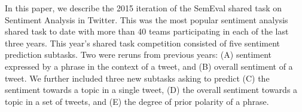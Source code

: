 In this paper, we describe the 2015 iteration of the SemEval shared task on Sentiment Analysis in Twitter.                                      This was the most popular sentiment analysis shared task to date with more than 40 teams participating in each of the last three years. This year's shared task competition consisted of five sentiment prediction subtasks. Two were reruns from previous years: (A) sentiment expressed by a phrase in the context of a tweet, and (B) overall sentiment of a tweet. We further included three new subtasks asking to predict (C) the sentiment towards a topic in a single tweet, (D) the overall sentiment towards a topic in a set of tweets, and (E) the degree of prior polarity of a phrase.
